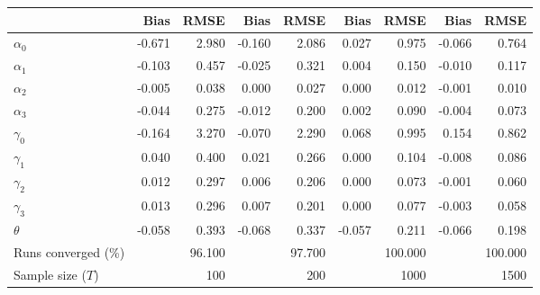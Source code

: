 
\begin{tabular}[t]{lrrrrrrrr}
\toprule
  & Bias & RMSE & Bias & RMSE & Bias & RMSE & Bias & RMSE\\
\midrule
$\alpha_{0}$ & -0.671 & 2.980 & -0.160 & 2.086 & 0.027 & 0.975 & -0.066 & 0.764\\
$\alpha_{1}$ & -0.103 & 0.457 & -0.025 & 0.321 & 0.004 & 0.150 & -0.010 & 0.117\\
$\alpha_{2}$ & -0.005 & 0.038 & 0.000 & 0.027 & 0.000 & 0.012 & -0.001 & 0.010\\
$\alpha_{3}$ & -0.044 & 0.275 & -0.012 & 0.200 & 0.002 & 0.090 & -0.004 & 0.073\\
$\gamma_{0}$ & -0.164 & 3.270 & -0.070 & 2.290 & 0.068 & 0.995 & 0.154 & 0.862\\
$\gamma_{1}$ & 0.040 & 0.400 & 0.021 & 0.266 & 0.000 & 0.104 & -0.008 & 0.086\\
$\gamma_{2}$ & 0.012 & 0.297 & 0.006 & 0.206 & 0.000 & 0.073 & -0.001 & 0.060\\
$\gamma_{3}$ & 0.013 & 0.296 & 0.007 & 0.201 & 0.000 & 0.077 & -0.003 & 0.058\\
$\theta$ & -0.058 & 0.393 & -0.068 & 0.337 & -0.057 & 0.211 & -0.066 & 0.198\\
Runs converged (\%) &  & 96.100 &  & 97.700 &  & 100.000 &  & 100.000\\
Sample size ($T$) &  & 100 &  & 200 &  & 1000 &  & 1500\\
\bottomrule
\end{tabular}
